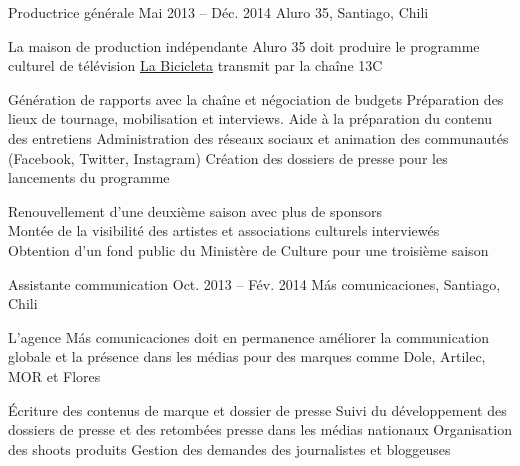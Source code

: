 \begin{joblist}
\item[Productrice générale]{Mai 2013 -- Déc. 2014}
     {Aluro 35, Santiago, Chili}
	 {	
		 La maison de production indépendante Aluro 35 doit produire le programme culturel de télévision \href{http://www.13.cl/c/programas/la-bicicleta}{La Bicicleta} transmit par la chaîne 13C \\
			
			\iftbftiny \setlength{\parskip}{-10pt} \fi
			\begin{itemize}
			  \iftbftiny \setlength\itemsep{-3pt} \fi
			  \cvitem[\checkmark] Génération de rapports avec la chaîne et négociation de budgets                       
			  \cvitem[\checkmark] Préparation des lieux de tournage, mobilisation et interviews. Aide à la préparation du contenu des entretiens 
			  \cvitem[\checkmark] Administration des réseaux sociaux et animation des communautés (Facebook, Twitter, Instagram)                 
			  \cvitem[\checkmark] Création des dossiers de presse pour les lancements du programme                                             
			\end{itemize}     
			
		 Renouvellement d'une deuxième saison avec plus de sponsors \\
		\mission{}	     Montée de la visibilité des artistes et associations culturels interviewés \\
		\mission{}           Obtention d’un fond public du Ministère de Culture pour une troisième saison 
	}



\item[Assistante communication]{Oct. 2013 -- Fév. 2014 }     
  	{Más comunicaciones, Santiago, Chili}     
  	{
		 L’agence Más comunicaciones doit en permanence améliorer la communication globale et la présence dans les médias
		pour des marques comme Dole, Artilec, MOR et Flores\\
		\mission{Missions :}

		\iftbftiny \setlength{\parskip}{-10pt} \fi
		\begin{itemize}
			  \iftbftiny \setlength\itemsep{-3pt} \fi
			  \cvitem[\checkmark]  Écriture des contenus de marque et dossier de presse                                        
			  \cvitem[\checkmark]  Suivi du développement des dossiers de presse et des retombées presse dans les médias nationaux                                             
			  \cvitem[\checkmark]  Organisation des shoots produits 
			  \cvitem[\checkmark]  Gestion des demandes des journalistes et bloggeuses 


\end{itemize}}
\end{joblist}
